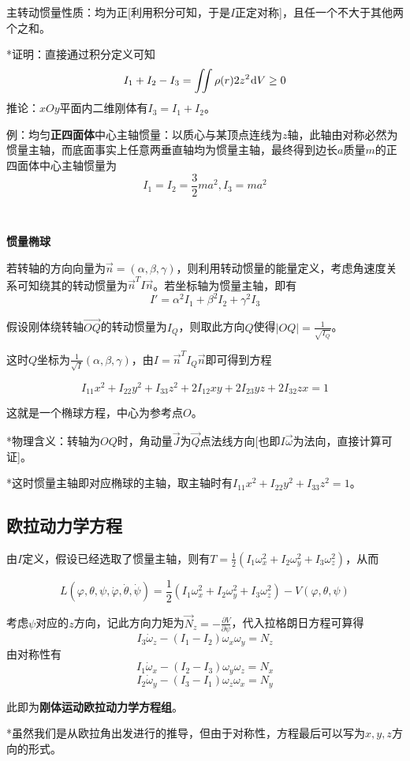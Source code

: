 \documentclass[a4paper,UTF8,fontset=windows]{ctexart}
\newcommand*{\dr}{\hspace{0.07em}\mathrm{d}}
\begin{document}
主转动惯量性质：均为正[利用积分可知，于是$I$正定对称]，且任一个不大于其他两个之和。

*证明：直接通过积分定义可知
$$I_1+I_2-I_3=\iint\rho(r)2z^2\dr V\ge0$$
推论：$xOy$平面内二维刚体有$I_3=I_1+I_2$。

例：均匀\textbf{正四面体}中心主轴惯量：以质心与某顶点连线为$z$轴，此轴由对称必然为惯量主轴，而底面事实上任意两垂直轴均为惯量主轴，最终得到边长$a$质量$m$的正四面体中心主轴惯量为
$$I_1=I_2=\frac{3}{2}ma^2,I_3=ma^2$$

\

\textbf{惯量椭球}

若转轴的方向向量为$\vec{n}=(\alpha,\beta,\gamma)$，则利用转动惯量的能量定义，考虑角速度关系可知绕其的转动惯量为$\vec{n}^TI\vec{n}$。若坐标轴为惯量主轴，即有
$$I'=\alpha^2I_1+\beta^2I_2+\gamma^2I_3$$

假设刚体绕转轴$\vec{OQ}$的转动惯量为$I_Q$，则取此方向$Q$使得$|OQ|=\frac{1}{\sqrt{I_Q}}$。

这时$Q$坐标为$\frac{1}{\sqrt{I}}(\alpha,\beta,\gamma)$，由$I=\vec{n}^TI_Q\vec{n}$即可得到方程

$$I_{11}x^2+I_{22}y^2+I_{33}z^2+2I_{12}xy+2I_{23}yz+2I_{32}zx=1$$

这就是一个椭球方程，中心为参考点$O$。

*物理含义：转轴为$OQ$时，角动量$\vec{J}$为$\vec{Q}$点法线方向[也即$I\vec{\omega}$为法向，直接计算可证]。

*这时惯量主轴即对应椭球的主轴，取主轴时有$I_{11}x^2+I_{22}y^2+I_{33}z^2=1$。

\subsection{欧拉动力学方程}

由$I$定义，假设已经选取了惯量主轴，则有$T=\frac{1}{2}(I_1\omega_x^2+I_2\omega_y^2+I_3\omega_z^2)$，从而

$$L(\varphi,\theta,\psi,\dot{\varphi},\dot{\theta},\dot{\psi})=\frac{1}{2}(I_1\omega_x^2+I_2\omega_y^2+I_3\omega_z^2)-V(\varphi,\theta,\psi)$$

考虑$\psi$对应的$z$方向，记此方向力矩为$\vec{N}_z=-\frac{\partial V}{\partial\psi}$，代入拉格朗日方程可算得
$$I_3\dot{\omega}_z-(I_1-I_2)\omega_x\omega_y=N_z$$
由对称性有
$$I_1\dot{\omega}_x-(I_2-I_3)\omega_y\omega_z=N_x$$
$$I_2\dot{\omega}_y-(I_3-I_1)\omega_z\omega_x=N_y$$

此即为\textbf{刚体运动欧拉动力学方程组}。

*虽然我们是从欧拉角出发进行的推导，但由于对称性，方程最后可以写为$x,y,z$方向的形式。
\end{document}
